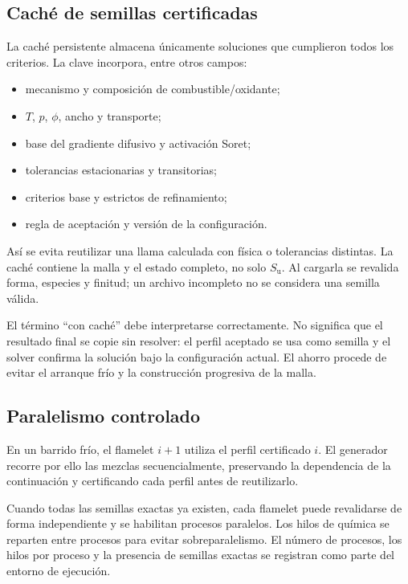 \documentclass[12pt,a4paper,twoside,openany]{book}
\newcommand{\Su}{S_{\mathrm{u}}}
\begin{document}
\subsection{Caché de semillas certificadas}

La caché persistente almacena únicamente soluciones que cumplieron todos los
criterios. La clave incorpora, entre otros campos:

\begin{itemize}
  \item mecanismo y composición de combustible/oxidante;
  \item \(T\), \(p\), \(\phi\), ancho y transporte;
  \item base del gradiente difusivo y activación Soret;
  \item tolerancias estacionarias y transitorias;
  \item criterios base y estrictos de refinamiento;
  \item regla de aceptación y versión de la configuración.
\end{itemize}

Así se evita reutilizar una llama calculada con física o tolerancias distintas.
La caché contiene la malla y el estado completo, no solo \(\Su\). Al cargarla se
revalida forma, especies y finitud; un archivo incompleto no se considera una
semilla válida.

El término ``con caché'' debe interpretarse correctamente. No significa que el
resultado final se copie sin resolver: el perfil aceptado se usa como semilla y
el solver confirma la solución bajo la configuración actual. El ahorro procede
de evitar el arranque frío y la construcción progresiva de la malla.

\subsection{Paralelismo controlado}

En un barrido frío, el flamelet \(i+1\) utiliza el perfil certificado \(i\).
El generador recorre por ello las mezclas secuencialmente, preservando la
dependencia de la continuación y certificando cada perfil antes de reutilizarlo.

Cuando todas las semillas exactas ya existen, cada flamelet puede revalidarse de
forma independiente y se habilitan procesos paralelos. Los hilos de química se
reparten entre procesos para evitar sobreparalelismo. El número de procesos,
los hilos por proceso y la presencia de semillas exactas se registran como
parte del entorno de ejecución.
\end{document}
